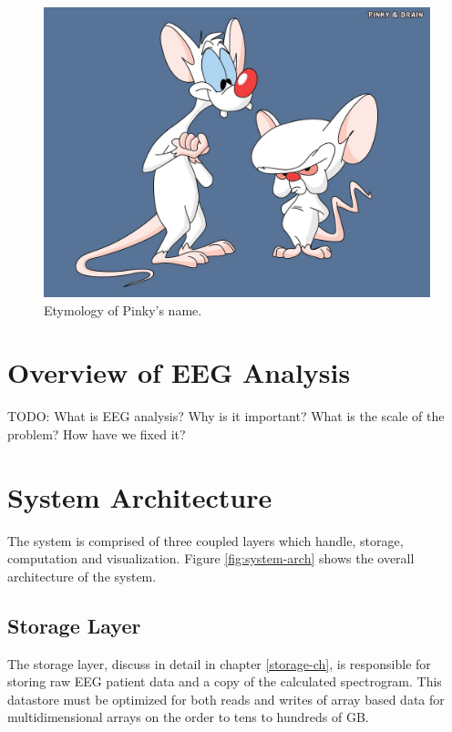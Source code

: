 \begin{figure}[h]
\begin{center}
\includegraphics[scale=0.75]{./img/pinky-and-the-brain.png}
\caption{Etymology of Pinky's name.}
\label{fig:pinky-and-the-brain}
\end{center}
\end{figure}

\section{Overview of EEG Analysis}

TODO:
What is EEG analysis? Why is it important? What is the scale of the problem? How have we fixed it?

\section{System Architecture}

The system is comprised of three coupled layers which handle, storage,
computation and visualization. Figure \ref{fig:system-arch} shows the overall
architecture of the system.

\subsection{Storage Layer}

The storage layer, discuss in detail in chapter \ref{storage-ch}, is responsible for
storing raw EEG patient data and a copy of the calculated spectrogram. This
datastore must be optimized for both reads and writes of array based data for
multidimensional arrays on the order to tens to hundreds of GB.

